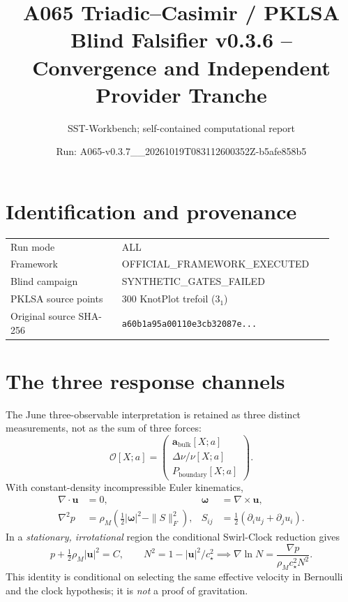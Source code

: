 \documentclass[10pt,a4paper]{article}
\title{A065 Triadic--Casimir / PKLSA\\ Blind Falsifier v0.3.6 -- Convergence and Independent Provider Tranche}
\author{SST-Workbench; self-contained computational report}
\date{Run: A065-v0.3.7\_\_20261019T083112600352Z-b5afe858b5}
\begin{document}
\maketitle
\begin{center}
\end{center}
\section{Identification and provenance}
\begin{tabular}{@{}p{0.32\linewidth}p{0.60\linewidth}@{}}
\toprule
Run mode & ALL \\
Framework & OFFICIAL\_FRAMEWORK\_EXECUTED \\
Blind campaign & SYNTHETIC\_GATES\_FAILED \\
PKLSA source points & 300 KnotPlot trefoil ($3_1$) \\
Original source SHA-256 & \texttt{a60b1a95a00110e3cb32087e...} \\
\bottomrule
\end{tabular}
\section{The three response channels}
The June three-observable interpretation is retained as three distinct measurements, not as the sum of three forces:
\[
\mathcal O[X;a]=\begin{pmatrix}
\mathbf a_{\mathrm{bulk}}[X;a]\\
\Delta\nu/\nu[X;a]\\
P_{\mathrm{boundary}}[X;a]
\end{pmatrix}.
\]
With constant-density incompressible Euler kinematics,
\begin{align}
\nabla\cdot\mathbf u&=0,&
\boldsymbol\omega&=\nabla\times\mathbf u,\\
\nabla^2p&=\rho_M\left(\tfrac12|\boldsymbol\omega|^2-\|S\|_F^2\right),&
S_{ij}&=\tfrac12(\partial_i u_j+\partial_j u_i).
\end{align}
In a \emph{stationary, irrotational} region the conditional Swirl-Clock reduction gives
\[
p+\tfrac12\rho_M|\mathbf u|^2=C,\qquad
N^2=1-|\mathbf u|^2/c_\star^2
\implies\nabla\ln N=\frac{\nabla p}{\rho_Mc_\star^2N^2}.
\]
This identity is conditional on selecting the same effective velocity in Bernoulli and the clock hypothesis; it is \emph{not} a proof of gravitation.
\end{document}
